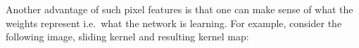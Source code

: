 \documentclass[a4paper,11pt]{article}
\begin{document}
Another advantage of such pixel features is that one can make sense of what the weights represent i.e.\ what the network is learning. For example, consider the following image, sliding kernel and resulting kernel map:

\begin{figure}[h]       
    \hspace{30px}
    \hspace{30px}

\end{figure}
\end{document}

